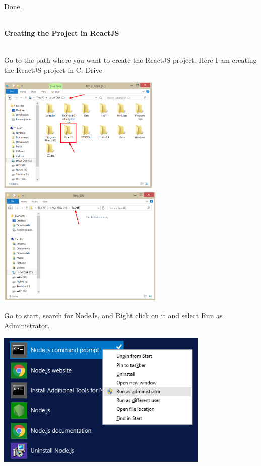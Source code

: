 \documentclass{article}
\begin{document}
\noindent 

\noindent \\
Done.

\noindent \\
\newpage
\noindent \textbf{Creating the Project in ReactJS}



 
\noindent \\
Go to the path where you want to create the ReactJS project. Here I am creating the ReactJS project in C: Drive
 

\begin{center}
	\noindent \includegraphics*[width=3.06in, height=2.22in]{IMG-06-26} \includegraphics*[width=3.14in, height=2.26in]{IMG-06-27}
\end{center}

\noindent 

 
   Go to start, search for NodeJs, and Right click on it and select Run as Administrator.
 

\begin{center}
	\noindent \includegraphics*[width=4.00in, height=2.57in]{IMG-06-28}
\end{center}
\end{document}
